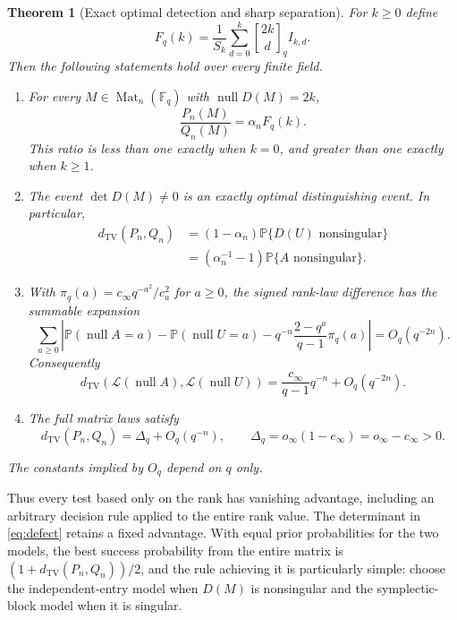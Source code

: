 \documentclass[11pt]{article}
\newtheorem{theorem}{Theorem}[section]
\theoremstyle{definition}\newtheorem{definition}[theorem]{Definition}
\theoremstyle{remark}\newtheorem{remark}[theorem]{Remark}
\newcommand{\F}{\mathbb F}
\newcommand{\Prob}{\mathbb P}
\newcommand{\TV}{d_{\mathrm{TV}}}
\newcommand{\Law}{\mathcal L}
\newcommand{\Mat}{\operatorname{Mat}}
\newcommand{\nul}{\operatorname{null}}
\newcommand{\gb}[2]{\genfrac{[}{]}{0pt}{}{#1}{#2}_{q}}
\newcommand{\1}{\mathbf 1}
\begin{document}
\begin{theorem}[Exact optimal detection and sharp separation]\label{thm:main}
For $k\ge0$ define
\begin{equation}\label{eq:F}
 F_q(k)=\frac1{S_k}\sum_{d=0}^{k}\gb{2k}{d} I_{k,d}.
\end{equation}
Then the following statements hold over every finite field.
\begin{enumerate}[label=\textup{(\roman*)},leftmargin=*]
\item For every $M\in\Mat_n(\F_q)$ with $\nul D(M)=2k$,
\begin{equation}\label{eq:likelihood}
 \frac{P_n(M)}{Q_n(M)}=\alpha_n F_q(k).
\end{equation}
This ratio is less than one exactly when $k=0$, and greater than one
exactly when $k\ge1$.
\item The event $\det D(M)\ne0$ is an exactly optimal distinguishing event.
In particular,
\begin{align}
 \TV(P_n,Q_n)&=(1-\alpha_n)\Prob\{D(U)\text{ nonsingular}\}\label{eq:tv1}\\
 &=(\alpha_n^{-1}-1)\Prob\{A\text{ nonsingular}\}.\label{eq:tv2}
\end{align}
\item With $\pi_q(a)=c_\infty q^{-a^2}/c_a^2$ for $a\ge0$, the signed
rank-law difference has the summable expansion
\begin{equation}\label{eq:rankexp}
 \sum_{a\ge0}\left|\Prob(\nul A=a)-\Prob(\nul U=a)
       -q^{-n}\frac{2-q^a}{q-1}\pi_q(a)\right|=O_q(q^{-2n}).
\end{equation}
Consequently
\begin{equation}\label{eq:ranksharp}
 \TV(\Law(\nul A),\Law(\nul U))
   =\frac{c_\infty}{q-1}q^{-n}+O_q(q^{-2n}).
\end{equation}
\item The full matrix laws satisfy
\begin{equation}\label{eq:limit}
 \TV(P_n,Q_n)=\Delta_q+O_q(q^{-n}),\qquad
 \Delta_q=o_\infty(1-e_\infty)=o_\infty-c_\infty>0.
\end{equation}
\end{enumerate}
The constants implied by $O_q$ depend on $q$ only.
\end{theorem}

Thus every test based only on the rank has vanishing advantage, including
an arbitrary decision rule applied to the entire rank value. The determinant
in \eqref{eq:defect} retains a fixed advantage. With equal prior probabilities
for the two models, the best success probability from the entire matrix is
$(1+\TV(P_n,Q_n))/2$, and the rule achieving it is particularly simple:
choose the independent-entry model when $D(M)$ is nonsingular and the
symplectic-block model when it is singular.
\end{document}
